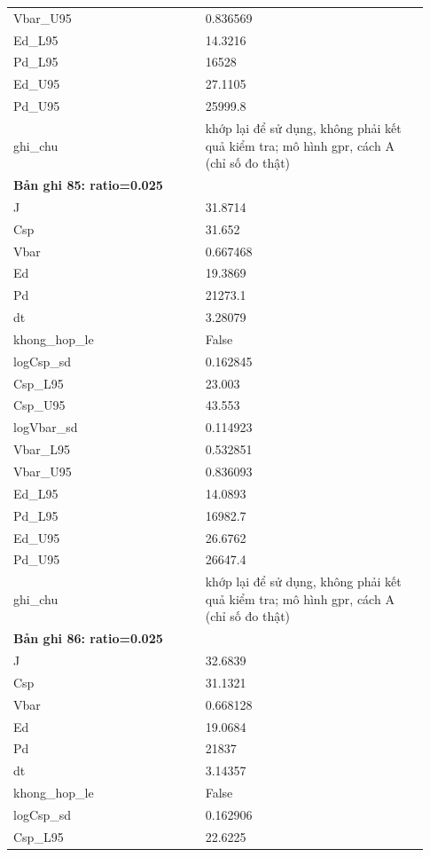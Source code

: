 \begin{longtable}{p{0.43\linewidth}p{0.50\linewidth}}
Vbar\_\allowbreak U95 & 0.836569 \\
Ed\_\allowbreak L95 & 14.3216 \\
Pd\_\allowbreak L95 & 16528 \\
Ed\_\allowbreak U95 & 27.1105 \\
Pd\_\allowbreak U95 & 25999.8 \\
ghi\_\allowbreak chu & khớp lại để sử dụng, không phải kết quả kiểm tra; mô hình gpr, cách A (chỉ số đo thật) \\
\midrule
\multicolumn{2}{p{0.95\linewidth}}{\textbf{Bản ghi 85: ratio=0.025}} \\
J & 31.8714 \\
Csp & 31.652 \\
Vbar & 0.667468 \\
Ed & 19.3869 \\
Pd & 21273.1 \\
dt & 3.28079 \\
khong\_\allowbreak hop\_\allowbreak le & False \\
logCsp\_\allowbreak sd & 0.162845 \\
Csp\_\allowbreak L95 & 23.003 \\
Csp\_\allowbreak U95 & 43.553 \\
logVbar\_\allowbreak sd & 0.114923 \\
Vbar\_\allowbreak L95 & 0.532851 \\
Vbar\_\allowbreak U95 & 0.836093 \\
Ed\_\allowbreak L95 & 14.0893 \\
Pd\_\allowbreak L95 & 16982.7 \\
Ed\_\allowbreak U95 & 26.6762 \\
Pd\_\allowbreak U95 & 26647.4 \\
ghi\_\allowbreak chu & khớp lại để sử dụng, không phải kết quả kiểm tra; mô hình gpr, cách A (chỉ số đo thật) \\
\midrule
\multicolumn{2}{p{0.95\linewidth}}{\textbf{Bản ghi 86: ratio=0.025}} \\
J & 32.6839 \\
Csp & 31.1321 \\
Vbar & 0.668128 \\
Ed & 19.0684 \\
Pd & 21837 \\
dt & 3.14357 \\
khong\_\allowbreak hop\_\allowbreak le & False \\
logCsp\_\allowbreak sd & 0.162906 \\
Csp\_\allowbreak L95 & 22.6225 \\

\end{longtable}
